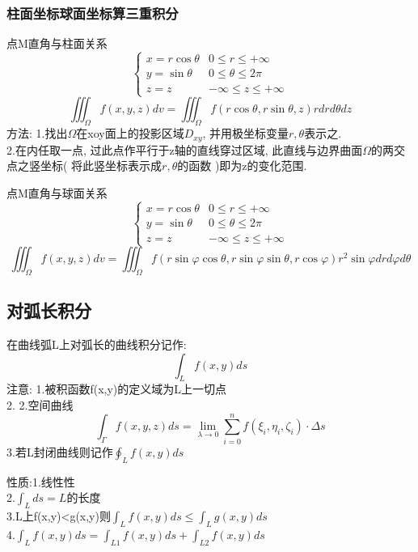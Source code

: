 \documentclass[10pt, a4paper, oneside]{ctexart}
\begin{document}
\begin{sloppypar}
	\subsubsection{柱面坐标球面坐标算三重积分}
	点M直角与柱面关系
	$$
		\begin{cases}
			x=r\cos\theta & 0\leq r \leq +\infty        \\
			y=\sin\theta  & 0\leq \theta \leq 2\pi      \\
			z=z           & -\infty\leq z \leq + \infty
		\end{cases}
	$$
	$$
		\iiint_{\Omega}f(x,y,z)dv=\iiint_{\Omega}f(r\cos\theta, r\sin\theta,z)rdrd\theta dz
	$$
	方法:
	1.找出$\Omega$在xoy面上的投影区域$D_{xy}$, 并用极坐标变量$r,\theta$表示之.\\
	2.在内任取一点, 过此点作平行于z轴的直线穿过区域, 此直线与边界曲面$\Omega$的两交点之竖坐标( 将此竖坐标表示成$r,\theta$的函数 )即为z的变化范围.

	点M直角与球面关系
	$$
		\begin{cases}
			x=r\cos\theta & 0\leq r \leq +\infty        \\
			y=\sin\theta  & 0\leq \theta \leq 2\pi      \\
			z=z           & -\infty\leq z \leq + \infty
		\end{cases}
	$$
	$$
		\iiint_{\Omega}f(x,y,z)dv=\iiint_{\Omega}f(r\sin\varphi\cos\theta, r\sin\varphi\sin\theta,r\cos\varphi)r^2\sin\varphi drd\varphi d\theta
	$$
	\subsection{对弧长积分}
	在曲线弧L上对弧长的曲线积分记作:
	$$
		\int_{L}f(x,y)ds
	$$
	注意:
	1.被积函数f(x,y)的定义域为L上一切点\\2.
	2.空间曲线
	$$\int_{\Gamma }f(x,y,z)ds=\lim_{\lambda\to 0}\sum_{i=0}^{n}f(\xi_i,\eta_i,\zeta_i)\cdot\Delta s$$
	3.若L封闭曲线则记作$\oint_L f(x,y)ds$

	性质:1.线性性\\2.$\int_L ds =L$的长度\\3.L上f(x,y)<g(x,y)则$\int_Lf(x,y)ds\leq\int_Lg(x,y)ds$
	\\
	4.$\int_Lf(x,y)ds=\int_{L1}f(x,y)ds+\int_{L2}f(x,y)ds$


\end{sloppypar}
\end{document}
